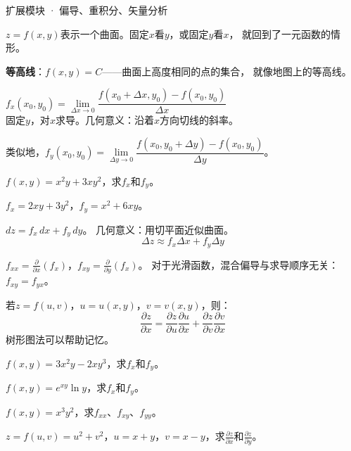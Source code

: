 \documentclass[a4paper,12pt]{ctexart}
\begin{document}
\pagestyle{empty}

\begin{center}
  \large 扩展模块 · 偏导、重积分、矢量分析
\end{center}
\vspace{0.3cm}



$z=f(x,y)$表示一个曲面。固定$x$看$y$，或固定$y$看$x$，
就回到了一元函数的情形。

\textbf{等高线}：$f(x,y)=C$——曲面上高度相同的点的集合，
就像地图上的等高线。


$f_x(x_0,y_0)=\lim\limits_{\Delta x\to0}\dfrac{f(x_0+\Delta x,y_0)-f(x_0,y_0)}{\Delta x}$\\
固定$y$，对$x$求导。几何意义：沿着$x$方向切线的斜率。

类似地，$f_y(x_0,y_0)=\lim\limits_{\Delta y\to0}\dfrac{f(x_0,y_0+\Delta y)-f(x_0,y_0)}{\Delta y}$。

\begin{example}
$f(x,y)=x^2y+3xy^2$，求$f_x$和$f_y$。
\end{example}
\begin{solution}
$f_x=2xy+3y^2$，$f_y=x^2+6xy$。
\end{solution}


$dz = f_x\,dx + f_y\,dy$。
几何意义：用切平面近似曲面。
\[
\Delta z \approx f_x\Delta x + f_y\Delta y
\]


$f_{xx}=\frac{\partial}{\partial x}(f_x)$，$f_{xy}=\frac{\partial}{\partial y}(f_x)$。
对于光滑函数，混合偏导与求导顺序无关：$f_{xy}=f_{yx}$。


若$z=f(u,v)$，$u=u(x,y)$，$v=v(x,y)$，则：
\[
\frac{\partial z}{\partial x} = \frac{\partial z}{\partial u}\frac{\partial u}{\partial x} + \frac{\partial z}{\partial v}\frac{\partial v}{\partial x}
\]
树形图法可以帮助记忆。


\begin{exercise}
\item $f(x,y)=3x^2y-2xy^3$，求$f_x$和$f_y$。
\item $f(x,y)=e^{xy}\ln y$，求$f_x$和$f_y$。
\item $f(x,y)=x^3y^2$，求$f_{xx}$、$f_{xy}$、$f_{yy}$。
\item $z=f(u,v)=u^2+v^2$，$u=x+y$，$v=x-y$，求$\frac{\partial z}{\partial x}$和$\frac{\partial z}{\partial y}$。
\end{exercise}
\end{document}
